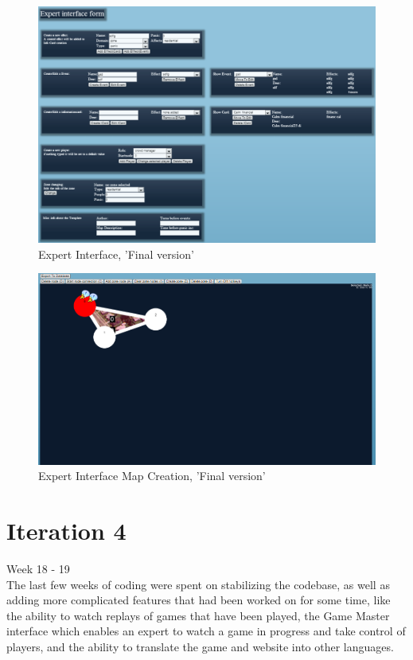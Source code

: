 \begin{figure}[H]
  \centering
    \includegraphics[width=1.0\textwidth]{img/ExpertInterfaceForms.png}
  \caption{Expert Interface, 'Final version'} 
  \label{fig:EcpertInterfaceForm}
\end{figure}


\begin{figure}[H]
  \centering
    \includegraphics[width=1.0\textwidth]{img/ExpertInterfaceCanvas.png}
  \caption{Expert Interface Map Creation, 'Final version'} 
  \label{fig:EcpertInterfaceCanvas}
\end{figure}

\section{Iteration 4}

Week 18 - 19\\
\newline
The last few weeks of coding were spent on stabilizing the codebase, as well as adding more complicated features that had been worked on for some time, like the ability to watch replays of games that have been played, the Game Master interface which enables an expert to watch a game in progress and take control of players, and the ability to translate the game and website into other languages.\\


